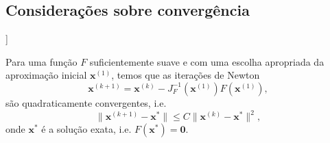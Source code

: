 \begin{ex}
% 
\end{ex}

\subsection{Considerações sobre convergência}

\begin{flushleft}
  [[tag:revisar]]
\end{flushleft}

Para uma função $F$ suficientemente suave e com uma escolha apropriada da aproximação inicial $\pmb{x}^{(1)}$, temos que as iterações de Newton
\begin{equation}
  \pmb{x}^{(k+1)} = \pmb{x}^{(k)} - J_F^{-1}(\pmb{x}^{(1)})F(\pmb{x}^{(1)}),
\end{equation}
são quadraticamente convergentes, i.e.
\begin{equation}
  \|\pmb{x}^{(k+1)} - \pmb{x}^*\| \leq C\|\pmb{x}^{(k)}-\pmb{x}^*\|^2,
\end{equation}
onde $\pmb{x}^*$ é a solução exata, i.e. $F(\pmb{x}^*) = \pmb{0}$.

